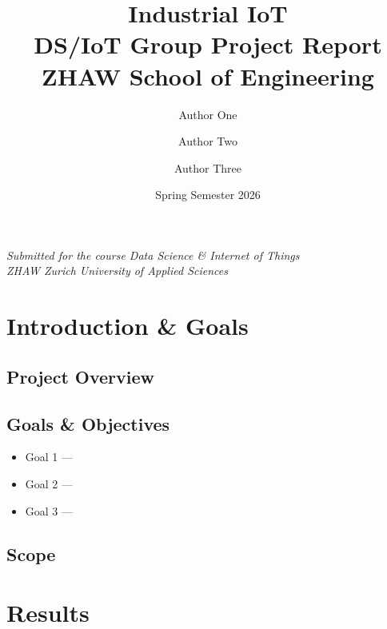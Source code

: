 \documentclass[a4paper,12pt]{article}
\title{
    \vspace{2cm}
    \textbf{Industrial IoT} \\[0.5em]
    \large DS/IoT Group Project Report \\[0.5em]
    \normalsize ZHAW School of Engineering
}
\author{
    Author One \and Author Two \and Author Three
}
\date{Spring Semester 2026}
\begin{document}
\maketitle
\thispagestyle{empty}
\vfill
\begin{center}
    \textit{Submitted for the course Data Science \& Internet of Things} \\
    \textit{ZHAW Zurich University of Applied Sciences}
\end{center}
\newpage

\tableofcontents
\newpage

\section{Introduction \& Goals}


\subsection{Project Overview}

\subsection{Goals \& Objectives}
\begin{itemize}
    \item Goal 1 — %
    \item Goal 2 — %
    \item Goal 3 — %
\end{itemize}

\subsection{Scope}

\section{Results}

\end{document}
